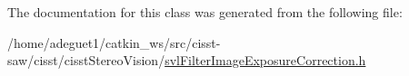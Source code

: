 The documentation for this class was generated from the following file\-:\begin{DoxyCompactItemize}
\item 
/home/adeguet1/catkin\-\_\-ws/src/cisst-\/saw/cisst/cisst\-Stereo\-Vision/\hyperlink{svl_filter_image_exposure_correction_8h}{svl\-Filter\-Image\-Exposure\-Correction.\-h}\end{DoxyCompactItemize}
